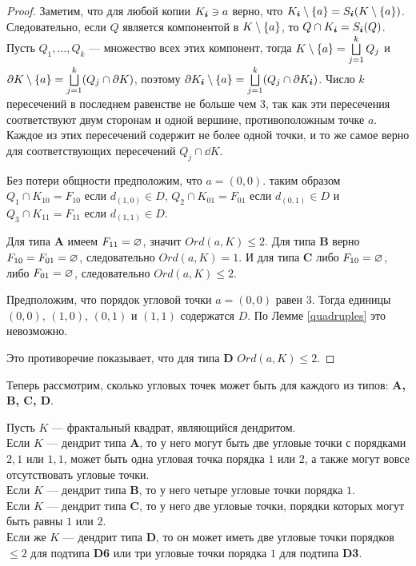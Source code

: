 \begin{proof}\label{proof:vertex_branching}
Заметим, что для любой копии $K_{\bm{i}}\ni a$ верно, что 
$K_{\bm{i}}\setminus \{a\}=S_{\bm{i}}(K\setminus \{a\})$. 
Следовательно, если $Q$ является компонентой в $K\setminus \{a\}$, то $Q\cap K_{\bm{i}}=S_{\bm{i}}(Q)$. 
Пусть $Q_1,\ldots, Q_k$ --- множество всех этих компонент, тогда $K\setminus \{a\}=\bigsqcup \limits_{j=1}^kQ_j$ и $\partial K\setminus \{a\}=\bigsqcup \limits_{j=1}^k(Q_j\cap\partial K)$, поэтому $\partial K_{\bm{i}}\setminus \{a\}=\bigsqcup \limits_{j=1}^k(Q_j\cap\partial K_{\bm{i}})$. 
Число $k$ пересечений в последнем равенстве не больше чем $3$, так как эти пересечения соответствуют двум сторонам и одной вершине, противоположным точке $a$. 
Каждое из этих пересечений содержит не более одной точки, и то же самое верно для соответствующих пересечений $Q_j\cap\dd K$.

Без потери общности предположим, что  $a=(0,0)$.  
таким образом $Q_1\cap K_{10}=F_{10}$ если $d_{(1,0)}\in D$, $Q_2\cap K_{01}=F_{01}$ если $d_{(0,1)}\in D$ и $Q_3\cap K_{11}=F_{11}$ если $d_{(1,1)}\in D$.

Для типа {\bf A} имеем $F_{11}=\varnothing$, значит $Ord(a,K)\leq 2$.
Для типа {\bf B} верно $F_{10}=F_{01}=\varnothing$, следовательно $Ord(a,K)=1$.
И для типа {\bf C} либо $F_{10}=\varnothing$, либо $F_{01}=\varnothing$, следовательно $Ord(a,K)\leq 2$.

Предположим, что порядок угловой точки $a=(0,0)$ равен $3$.
Тогда единицы $(0,0)$, $(1,0)$, $(0,1)$ и $(1,1)$ содержатся $D$. 
По Лемме \ref{quadruples} это невозможно.

Это противоречие показывает, что для типа {\bf D} $Ord(a,K)\leq 2$.
\end{proof}

Теперь рассмотрим, сколько угловых точек может быть для каждого из типов: {\bf A, B, C, D}.

\begin{theorem}\label{thm:corner}
Пусть $K$ --- фрактальный квадрат, являющийся дендритом. \\
Если $K$ --- дендрит типа  {\bf A}, то у него могут быть две угловые точки с порядками $2,1$ или $1,1$, может быть одна угловая точка порядка $1$ или $2$, а также могут вовсе отсутствовать угловые точки.\\
Если $K$ --- дендрит типа  {\bf B}, то у него четыре угловые точки порядка $1$.\\
Если $K$ --- дендрит типа  {\bf C}, то у него две угловые точки, порядки которых могут быть равны $1$ или $2$.\\
Если же $K$ --- дендрит типа  {\bf D}, то он может иметь две угловые точки порядков $\le 2$ для подтипа {\bf D6} или три угловые точки порядка $1$ для подтипа {\bf D3}.
\end{theorem}

